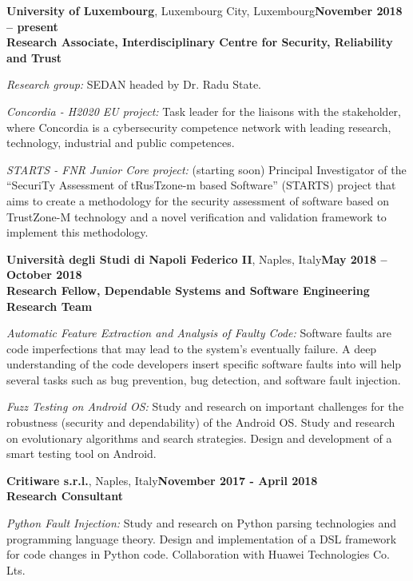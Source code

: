 \documentclass[margin,line]{resume}
\begin{document}
\begin{resume}
\textbf{University of Luxembourg}, Luxembourg City, Luxembourg\hfill\textbf{November 2018 -- present}\\
\textbf{Research Associate, Interdisciplinary Centre for Security, Reliability and Trust}\hfill 
\vspace{-3mm}\\\vspace{-1mm}
\begin{list2}
	\item \filbreak\textit{Research group:} SEDAN headed by Dr. Radu State.
	\item \filbreak\textit{Concordia - H2020 EU project:} Task leader for the liaisons with the stakeholder, where Concordia is a cybersecurity competence network with leading research, technology, industrial and public competences.
	\item \filbreak\textit{STARTS - FNR Junior Core project:} (starting soon) Principal Investigator of the ``SecuriTy Assessment of tRusTzone-m based Software'' (STARTS) project that aims to create a methodology for the security assessment of software based on TrustZone-M technology and a novel verification and validation framework to implement this methodology. 
\end{list2}


\textbf{Universit\`a degli Studi di Napoli Federico II}, Naples, Italy\hfill\textbf{May 2018 -- October 2018}\\
\textbf{Research Fellow, Dependable Systems and Software Engineering Research Team}\hfill 
\vspace{-3mm}\\\vspace{-1mm}
\begin{list2}
	\item \filbreak\textit{Automatic Feature Extraction and Analysis of Faulty Code:} Software faults are code imperfections that may lead to the system's eventually failure. A deep understanding of the code developers insert specific software faults into will help several tasks such as bug prevention, bug detection, and software fault injection.
    \item \filbreak\textit{Fuzz Testing on Android OS:} Study and research on important challenges for the robustness (security and dependability) of the Android OS. Study and research on evolutionary algorithms and search strategies. Design and development of a smart testing tool on Android.
\end{list2}

\textbf{Critiware s.r.l.}, Naples, Italy\hfill\textbf{November 2017 - April 2018}\\
\textbf{Research Consultant}\hfill 
\vspace{-3mm}\\\vspace{-1mm}
\begin{list2}
	\item \filbreak\textit{Python Fault Injection:} Study and research on Python parsing technologies and programming language theory. Design and implementation of a DSL framework for code changes in Python code. Collaboration with Huawei Technologies Co. Lts.
\end{list2}


\end{resume}
\end{document}
